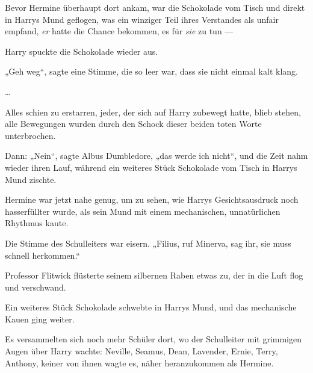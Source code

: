 Bevor Hermine überhaupt dort ankam, war die Schokolade vom Tisch und direkt in Harrys Mund geflogen, was ein winziger Teil ihres Verstandes als unfair empfand, \emph{er} hatte die Chance bekommen, es für \emph{sie} zu tun —

Harry spuckte die Schokolade wieder aus.

„Geh weg“, sagte eine Stimme, die so leer war, dass sie nicht einmal kalt klang.

…

Alles schien zu erstarren, jeder, der sich auf Harry zubewegt hatte, blieb stehen, alle Bewegungen wurden durch den Schock dieser beiden toten Worte unterbrochen.

Dann:
„Nein“, sagte Albus Dumbledore, „das werde ich nicht“, und die Zeit nahm wieder ihren Lauf, während ein weiteres Stück Schokolade vom Tisch in Harrys Mund zischte.

Hermine war jetzt nahe genug, um zu sehen, wie Harrys Gesichtsausdruck noch hasserfüllter wurde, als sein Mund mit einem mechanischen, unnatürlichen Rhythmus kaute.

Die Stimme des Schulleiters war eisern.
„Filius, ruf Minerva, sag ihr, sie muss schnell herkommen.“

Professor Flitwick flüsterte seinem silbernen Raben etwas zu, der in die Luft flog und verschwand.

Ein weiteres Stück Schokolade schwebte in Harrys Mund, und das mechanische Kauen ging weiter.

Es versammelten sich noch mehr Schüler dort, wo der Schulleiter mit grimmigen Augen über Harry wachte: Neville, Seamus, Dean, Lavender, Ernie, Terry, Anthony, keiner von ihnen wagte es, näher heranzukommen als Hermine.

